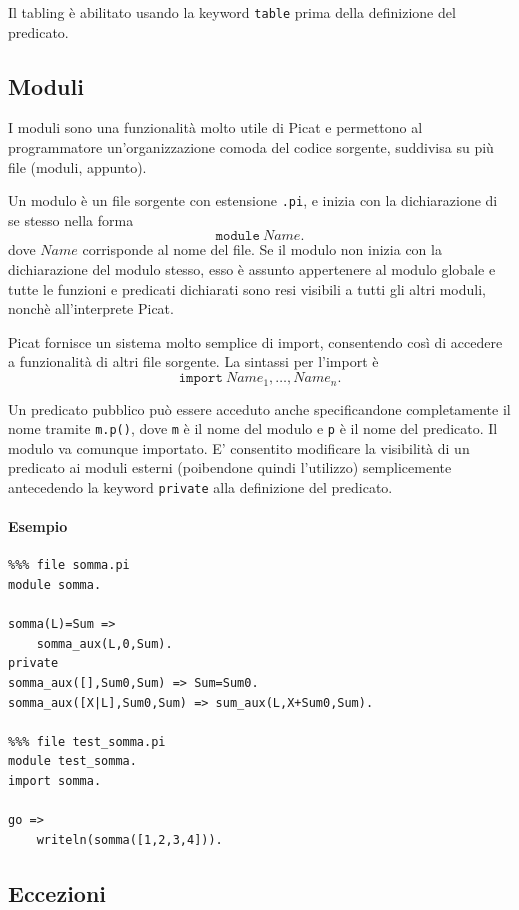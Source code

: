\documentclass[12pt,a4paper,openright]{book}  %
\begin{document}
Il tabling è abilitato usando la keyword \verb|table| prima della
definizione del predicato.

\subsection{Moduli}
\label{subsec:picat_advanced_modules}

I moduli sono una funzionalità molto utile di Picat e permettono al
programmatore un'organizzazione comoda del codice sorgente, suddivisa
su più file (moduli, appunto).

Un modulo è un file sorgente con estensione \texttt{.pi}, e
inizia con la dichiarazione di se stesso nella forma 
\[
\texttt{module}\ Name.
\]
dove $Name$ corrisponde al nome del file. Se il modulo non inizia con
la dichiarazione del modulo stesso, esso è assunto appertenere al
modulo globale e tutte le funzioni e predicati dichiarati sono resi
visibili a tutti gli altri moduli, nonchè all'interprete Picat.

Picat fornisce un sistema molto semplice di import, consentendo così
di accedere a funzionalità di altri file sorgente. La sintassi per
l'import è
\[
\texttt{import}\ Name_1, \ldots, Name_n.
\]

Un predicato pubblico può essere acceduto anche specificandone
completamente il nome tramite \texttt{m.p()}, dove \texttt{m} è il
nome del modulo e \texttt{p} è il nome del predicato. Il modulo va
comunque importato. E' consentito modificare la visibilità di un
predicato ai moduli esterni (poibendone quindi l'utilizzo)
semplicemente antecedendo la keyword \texttt{private} alla definizione
del predicato.

\paragraph{Esempio}

\begin{verbatim}
%%% file somma.pi
module somma.

somma(L)=Sum =>
    somma_aux(L,0,Sum).
private
somma_aux([],Sum0,Sum) => Sum=Sum0.
somma_aux([X|L],Sum0,Sum) => sum_aux(L,X+Sum0,Sum).

%%% file test_somma.pi
module test_somma.
import somma.

go =>
    writeln(somma([1,2,3,4])).
\end{verbatim}

\subsection{Eccezioni}
\label{subsec:picat_advanced_exceptions}
\end{document}
